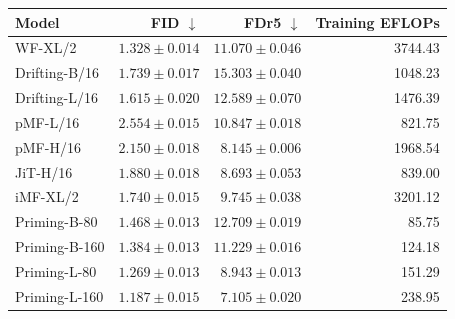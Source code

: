 \begin{tabular}{lrrr}
\toprule
Model & FID $\downarrow$ & FDr5 $\downarrow$ & Training EFLOPs \\
\midrule
WF-XL/2 & $1.328 \pm 0.014$ & $11.070 \pm 0.046$ & 3744.43 \\
Drifting-B/16 & $1.739 \pm 0.017$ & $15.303 \pm 0.040$ & 1048.23 \\
Drifting-L/16 & $1.615 \pm 0.020$ & $12.589 \pm 0.070$ & 1476.39 \\
pMF-L/16 & $2.554 \pm 0.015$ & $10.847 \pm 0.018$ & 821.75 \\
pMF-H/16 & $2.150 \pm 0.018$ & $8.145 \pm 0.006$ & 1968.54 \\
JiT-H/16 & $1.880 \pm 0.018$ & $8.693 \pm 0.053$ & 839.00 \\
iMF-XL/2 & $1.740 \pm 0.015$ & $9.745 \pm 0.038$ & 3201.12 \\
Priming-B-80 & $1.468 \pm 0.013$ & $12.709 \pm 0.019$ & 85.75 \\
Priming-B-160 & $1.384 \pm 0.013$ & $11.229 \pm 0.016$ & 124.18 \\
Priming-L-80 & $1.269 \pm 0.013$ & $8.943 \pm 0.013$ & 151.29 \\
Priming-L-160 & $1.187 \pm 0.015$ & $7.105 \pm 0.020$ & 238.95 \\
\bottomrule
\end{tabular}
